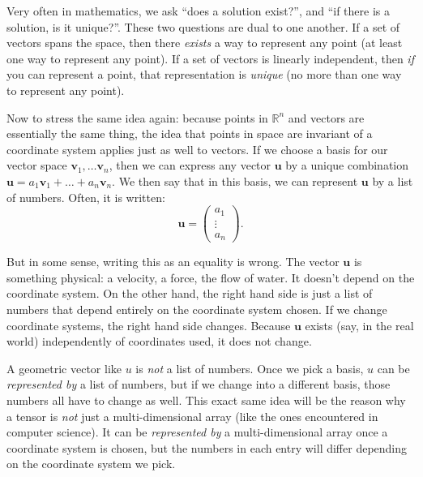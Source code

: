 
	Very often in mathematics, we ask ``does a solution exist?'', and ``if there is a solution, is it unique?''. These two questions are dual to one another. If a set of vectors spans the space, then there \emph{exists} a way to represent any point (at least one way to represent any point). If a set of vectors is linearly independent, then \emph{if} you can represent a point, that representation is \emph{unique} (no more than one way to represent any point).
	
	Now to stress the same idea again: because points in $\mathbb R^n$ and vectors are essentially the same thing, the idea that points in space are invariant of a coordinate system applies just as well to vectors. If we choose a basis for our vector space $\mathbf v_1, \dots \mathbf v_n$, then we can express any vector $\mathbf u$ by a unique combination $\mathbf u = a_1 \mathbf v_1 + \dots + a_n \mathbf v_n$. We then say that in this basis, we can represent $\mathbf u$ by a list of numbers. Often, it is written:
	\begin{equation*}
		\mathbf u = \begin{pmatrix} a_1 \\ \vdots \\a_n	\end{pmatrix}.
	\end{equation*}
	
	But in some sense, writing this as an equality is wrong. The vector $\mathbf u$ is something physical: a velocity, a force, the flow of water. It doesn't depend on the coordinate system. On the other hand, the right hand side is just a list of numbers that depend entirely on the coordinate system chosen. If we change coordinate systems, the right hand side changes. Because $\mathbf u$ exists (say, in the real world) independently of coordinates used, it does not change.
	
	A geometric vector like $u$ is \emph{not} a list of numbers. Once we pick a basis, $u$ can be \emph{represented by} a list of numbers, but if we change into a different basis, those numbers all have to change as well. This exact same idea will be the reason why a tensor is \emph{not} just a multi-dimensional array (like the ones encountered in computer science). It can be \emph{represented by} a multi-dimensional array once a coordinate system is chosen, but the numbers in each entry will differ depending on the coordinate system we pick. 
	
